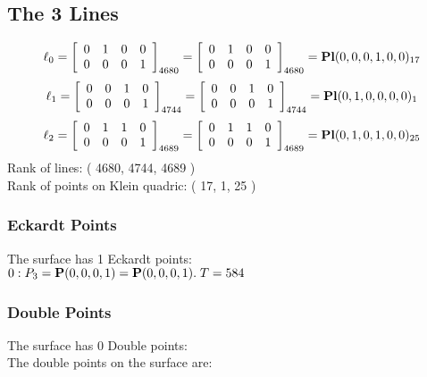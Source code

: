 \documentclass{article}
\newcommand{\bP}{{\bf P}}
\begin{document}
{\subsection*{The 3 Lines}
$$
\ell_{0} = 
\left[
\begin{array}{*{4}{r}}
0 & 1 & 0 & 0\\
0 & 0 & 0 & 1\\
\end{array}
\right]
_{4680}
=
\left[
\begin{array}{*{4}c}
0  & 1  & 0  & 0\\
0  & 0  & 0  & 1\\
\end{array}
\right]_{4680}
={\rm\bf Pl}(0,0,0,1,0,0 )_{17}$$
$$
\ell_{1} = 
\left[
\begin{array}{*{4}{r}}
0 & 0 & 1 & 0\\
0 & 0 & 0 & 1\\
\end{array}
\right]
_{4744}
=
\left[
\begin{array}{*{4}c}
0  & 0  & 1  & 0\\
0  & 0  & 0  & 1\\
\end{array}
\right]_{4744}
={\rm\bf Pl}(0,1,0,0,0,0 )_{1}$$
$$
\ell_{2} = 
\left[
\begin{array}{*{4}{r}}
0 & 1 & 1 & 0\\
0 & 0 & 0 & 1\\
\end{array}
\right]
_{4689}
=
\left[
\begin{array}{*{4}c}
0  & 1  & 1  & 0\\
0  & 0  & 0  & 1\\
\end{array}
\right]_{4689}
={\rm\bf Pl}(0,1,0,1,0,0 )_{25}$$
Rank of lines: ( 4680, 4744, 4689 )\\
Rank of points on Klein quadric: ( 17, 1, 25 )\\
\subsubsection*{Eckardt Points}
The surface has 1 Eckardt points:\\
$0 : P_{3}=\bP(0, 0, 0, 1) = \bP(0, 0, 0, 1).\; T= 584$\\
\subsubsection*{Double Points}
The surface has 0 Double points:\\
The double points on the surface are:\\
\begin{multicols}{2}
\noindent
\end{multicols}
}
\end{document}
